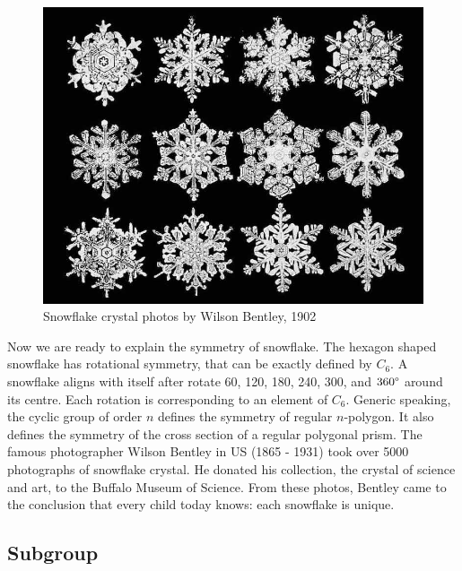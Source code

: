 \documentclass[b5paper]{article}
\begin{document}
\begin{figure}[htbp]
 \centering
 \includegraphics[scale=0.3]{img/snowflakes.jpg}
 \caption{Snowflake crystal photos by Wilson Bentley, 1902}
 \label{fig:snowflakes}
\end{figure}

Now we are ready to explain the symmetry of snowflake. The hexagon shaped snowflake has rotational symmetry, that can be exactly defined by $C_6$. A snowflake aligns with itself after rotate 60\degree, 120\degree, 180\degree, 240\degree, 300\degree, and $360\degree$ around its centre. Each rotation is corresponding to an element of $C_6$. Generic speaking, the cyclic group of order $n$ defines the symmetry of regular $n$-polygon. It also defines the symmetry of the cross section of a regular polygonal prism. The famous photographer Wilson Bentley in US (1865 - 1931) took over 5000 photographs of snowflake crystal. He donated his collection, the crystal of science and art, to the Buffalo Museum of Science. From these photos, Bentley came to the conclusion that every child today knows: each snowflake is unique.

\begin{Exercise}
\end{Exercise}

\subsection{Subgroup}
\end{document}
